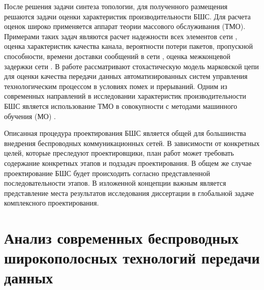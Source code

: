 После решения задачи синтеза топологии, для полученного размещения решаются задачи оценки характеристик производительности БШС. Для расчета оценок широко применяется аппарат теории массового обслуживания (ТМО). Примерами таких задач являются расчет надежности всех элементов сети \cite{Wankpo2020, Krishnamoorthy2021, Kozyrev2019}, оценка характеристик качества канала, вероятности потери пакетов, пропускной способности, времени доставки сообщений в сети \cite{Larionov2019, Vishnevsky2016_Methods_of_performance, Vishnevsky2016_Review_of_methodology, Wang2017, Sandmann2012, Baumann2017}, оценка межконцевой задержки сети \cite{Wang2017, Sandmann2012}. В работе \cite{Eremenko2013} рассматривают стохастическую модель марковской цепи для оценки качества передачи данных автоматизированных систем управления технологическим процессом  в условиях помех и прерываний. Одним из современных направлений в исследовании характеристик производительности БШС является использование ТМО в совокупности с методами машинного обучения (МО) \cite{Lovas2021, SatyaHermanto2018}.

Описанная процедура проектирования БШС является общей для большинства внедрения беспроводных коммуникационных сетей. В зависимости от конкретных целей, которые преследуют проектировщики, план работ может требовать содержание конкретных этапов и подзадач проектирования. В общем же случае проектирование БШС будет происходить согласно представленной последовательности этапов. В изложенной концепции важным является представление места результатов исследования диссертации в глобальной задаче комплексного проектирования.


\section{Анализ современных беспроводных широкополосных технологий 
передачи данных}





